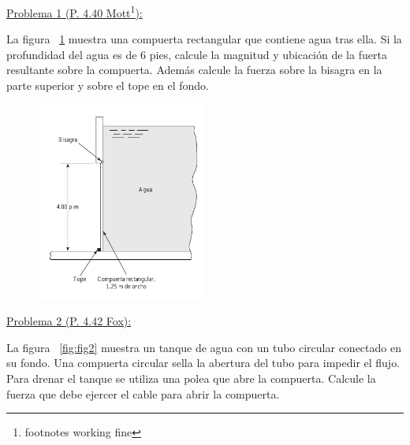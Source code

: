 \documentclass[11pt]{report}
\begin{document}

\vspace{1cm}


\vspace{1cm}

\underline {Problema 1 (P. 4.40 Mott\footnote{footnotes working fine}):}

\vspace{0.2cm}

La figura ~\ref{fig:fig1} muestra una compuerta rectangular que contiene agua tras ella. Si la profundidad del agua es de $6$ pies, calcule la magnitud y ubicaci\'on de la fuerta resultante sobre la compuerta. Adem\'as calcule la fuerza sobre la bisagra en la parte superior y sobre el tope en el fondo.

\begin{figure}[H]
\centering\includegraphics[width=0.5\textwidth]{p1.png}
\caption{\label{fig:fig1} }
\end{figure}


\newpage

\underline {Problema 2 (P. 4.42 Fox):}

\vspace{0.2cm}

La figura ~\ref{fig:fig2} muestra un tanque de agua con un tubo circular conectado en su fondo. Una compuerta circular sella la abertura del tubo para impedir el flujo. Para drenar el tanque se utiliza una polea que abre la compuerta. Calcule la fuerza que debe ejercer el cable para abrir la compuerta.
\end{document}
